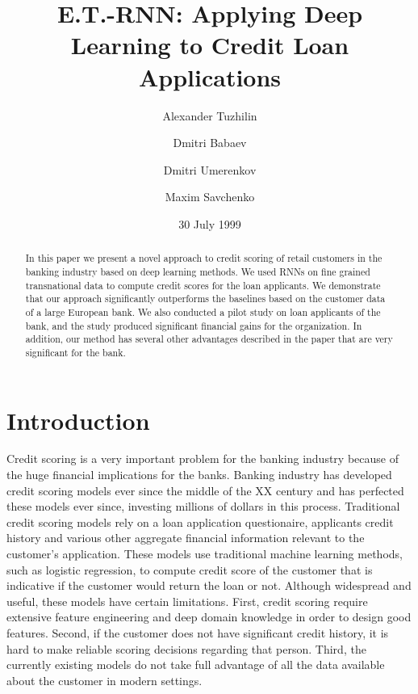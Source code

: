 \documentclass[sigconf]{acmart}
\begin{document}
\title{E.T.-RNN: Applying Deep Learning to Credit Loan Applications}

\author{Alexander Tuzhilin}

\author{Dmitri Babaev}
\affiliation{
  \institution{}
}

\author{Dmitri Umerenkov}
\affiliation{
  \institution{}
}

\author{Maxim Savchenko}
\affiliation{
  \institution{}
}

\date{30 July 1999}

\begin{abstract}
In this paper we present a novel approach to credit scoring of retail customers in the banking industry based on deep learning methods. We used RNNs on fine grained transnational data to compute credit scores for the loan applicants. We demonstrate that our approach significantly outperforms the baselines based on the customer data of a large European bank. We also conducted a pilot study on loan applicants of the bank, and the study produced significant financial gains for the organization.
In addition, our method has several other advantages described in the paper that are very significant for the bank.
\end{abstract}


\maketitle

\section{Introduction}

Credit scoring is a very important problem for the banking industry because of the huge financial implications for the banks. Banking industry has developed credit scoring models ever since the middle of the XX century  and has perfected these models ever since, investing millions of dollars in this process. Traditional credit scoring models rely on a loan application questionaire, applicants credit history and various other aggregate financial information relevant to the customer's application. These models use traditional machine learning methods, such as logistic regression, to compute credit score of the customer that is indicative if the customer would return the loan or not. Although widespread and useful, these models have certain limitations. First, credit scoring require extensive feature engineering and deep domain knowledge in order to design good features.
Second, if the customer does not have significant credit history, it is hard to make reliable scoring decisions regarding that person. Third, the currently existing models do not take full advantage of all the data available about the customer in modern settings.
\end{document}
